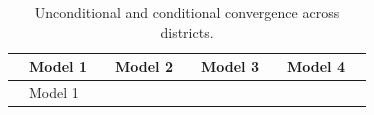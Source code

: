 \documentclass[
  letterpaper,
  DIV=11,
  numbers=noendperiod]{scrartcl}
\begin{document}
\begin{longtable}[]{@{}
  >{\raggedright\arraybackslash}p{}
  >{\raggedright\arraybackslash}p{}
  >{\raggedright\arraybackslash}p{}
  >{\raggedright\arraybackslash}p{}
  >{\raggedright\arraybackslash}p{}
  >{\raggedright\arraybackslash}p{}
  >{\raggedright\arraybackslash}p{}
  >{\raggedright\arraybackslash}p{}
  >{\raggedright\arraybackslash}p{}@{}}
\caption{Unconditional and conditional convergence across
districts.}\label{tbl-models}\tabularnewline
\toprule\noalign{}
\begin{minipage}[b]{\linewidth}\raggedright
\end{minipage} & \begin{minipage}[b]{\linewidth}\raggedright
Model 1
\end{minipage} & \begin{minipage}[b]{\linewidth}\raggedright
\end{minipage} & \begin{minipage}[b]{\linewidth}\raggedright
Model 2
\end{minipage} & \begin{minipage}[b]{\linewidth}\raggedright
\end{minipage} & \begin{minipage}[b]{\linewidth}\raggedright
Model 3
\end{minipage} & \begin{minipage}[b]{\linewidth}\raggedright
\end{minipage} & \begin{minipage}[b]{\linewidth}\raggedright
Model 4
\end{minipage} & \begin{minipage}[b]{\linewidth}\raggedright
\end{minipage} \\
\midrule\noalign{}
\endfirsthead
\toprule\noalign{}
\begin{minipage}[b]{\linewidth}\raggedright
\end{minipage} & \begin{minipage}[b]{\linewidth}\raggedright
Model 1
\end{minipage} & \begin{minipage}[b]{\linewidth}\raggedright

\end{minipage}
\end{longtable}
\end{document}

